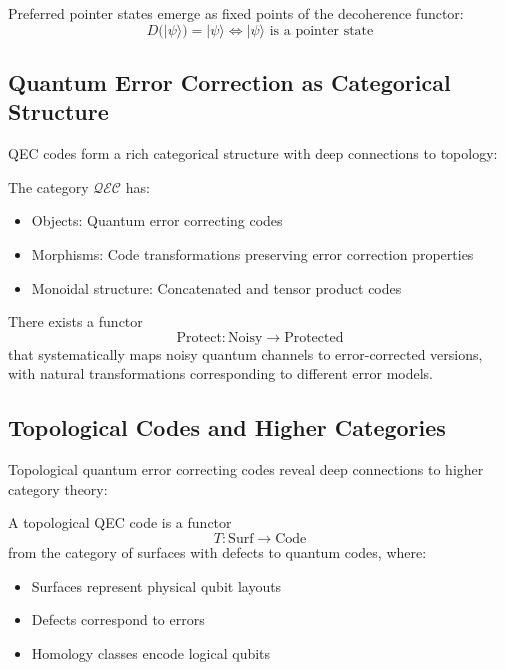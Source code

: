 \begin{example}
Preferred pointer states emerge as fixed points of the decoherence functor:
\[
D(|\psi\rangle) = |\psi\rangle \iff |\psi\rangle \text{ is a pointer state}
\]
\end{example}

\subsection{Quantum Error Correction as Categorical Structure}

QEC codes form a rich categorical structure with deep connections to topology:

\begin{definition}
The category $\mathcal{QEC}$ has:
\begin{itemize}
\item Objects: Quantum error correcting codes
\item Morphisms: Code transformations preserving error correction properties
\item Monoidal structure: Concatenated and tensor product codes
\end{itemize}
\end{definition}

\begin{theorem}
There exists a functor
\[
\text{Protect}: \text{Noisy} \to \text{Protected}
\]
that systematically maps noisy quantum channels to error-corrected versions, with natural transformations corresponding to different error models.
\end{theorem}

\subsection{Topological Codes and Higher Categories}

Topological quantum error correcting codes reveal deep connections to higher category theory:

\begin{definition}
A topological QEC code is a functor
\[
T: \text{Surf} \to \text{Code}
\]
from the category of surfaces with defects to quantum codes, where:
\begin{itemize}
\item Surfaces represent physical qubit layouts
\item Defects correspond to errors
\item Homology classes encode logical qubits
\end{itemize}
\end{definition}

